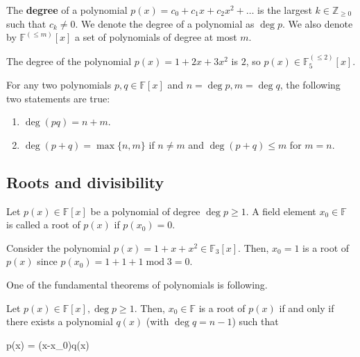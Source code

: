 \documentclass[../lecture-notes-148x210.tex]{subfiles}
\begin{document}
\vspace{-4mm}

\begin{definition}
    The \textbf{degree} of a polynomial $p(x) = c_0+c_1x+c_2x^2+\dots$ is the largest $k \in \mathbb{Z}_{\geq 0}$ such that $c_k \neq 0$. We denote the degree of a polynomial as $\deg p$. We also denote by $\mathbb{F}^{(\leq m)}[x]$ a set of polynomials of degree at most $m$.
\end{definition}

\begin{example}
    The degree of the polynomial $p(x) = 1 + 2x + 3x^2$ is $2$, so $p(x) \in
    \mathbb{F}_5^{(\leq 2)}[x]$.
\end{example}

\begin{theorem}
    For any two polynomials $p,q \in \mathbb{F}[x]$ and $n = \deg p, m = \deg q$, the following two statements are true:
    \begin{enumerate}
        \item $\deg (pq) = n + m$.
        \item $\deg (p + q) = \max\{n,m\}$ if $n \neq m$ and $\deg (p+q) \leq m$ for $m=n$.
    \end{enumerate}
\end{theorem}

\subsection{Roots and divisibility}

\begin{definition}
    Let $p(x) \in \mathbb{F}[x]$ be a polynomial of degree $\deg p \geq 1$. A field element $x_0 \in \mathbb{F}$ is called a root of $p(x)$ if $p(x_0) = 0$.
\end{definition}

\vspace{-4mm}

\begin{example}
    Consider the polynomial $p(x) = 1 + x + x^2 \in \mathbb{F}_3[x]$. Then, $x_0=1$ is a root of $p(x)$ since $p(x_0) = 1 + 1 + 1 \; \text{mod} \; 3 = 0$.
\end{example}

One of the fundamental theorems of polynomials is following.

\begin{theorem}
    Let $p(x) \in \mathbb{F}[x], \deg p \geq 1$. Then, $x_0 \in \mathbb{F}$ is a root of $p(x)$ if and only if there exists a polynomial $q(x)$ (with $\deg q = n-1$) such that
    \begin{xequation}
        p(x) = (x-x_0)q(x)
    \end{xequation}
\end{theorem}
\end{document}
